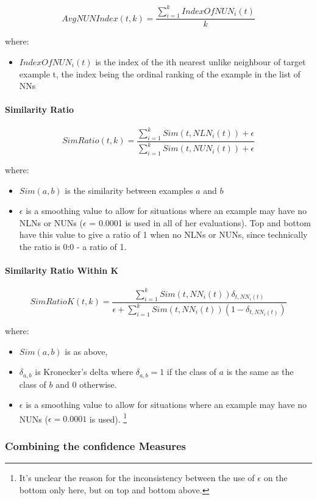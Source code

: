 \documentclass[a4paper,11pt]{report}
\begin{document}
\[
AvgNUNIndex(t,k)=\frac{\sum_{i=1}^{k}IndexOfNUN_{i}(t)}{k}
\]

where:
\begin{itemize}
	\item $IndexOfNUN_{i}(t)$ is the index of the ith nearest unlike neighbour of target example t, the index being the ordinal ranking of the example in the list of NNs
\end{itemize}

\paragraph{Similarity Ratio}
\[
SimRatio(t,k)=\frac{\sum_{i=1}^{k}Sim(t,NLN_{i}(t))+\epsilon}{\sum_{i=1}^{k}Sim(t,NUN_{i}(t))+\epsilon}
\]

where:
\begin{itemize}
	\item $Sim(a, b)$ is the similarity between examples $a$ and $b$ 
	\item $\epsilon$ is a smoothing value to allow for situations where an example may have no NLNs or NUNs ($\epsilon$ = 0.0001 is used in all of her evaluations). Top and bottom have this value to give a ratio of 1 when no NLNs or NUNs, since technically the ratio is 0:0 - a ratio of 1.
\end{itemize}

\paragraph{Similarity Ratio Within K}
\[
SimRatioK(t,k)=\frac{\sum_{i=1}^{k}Sim(t,NN_{i}(t))\delta_{t,NN_{i}(t)}}{\epsilon+\sum_{i=1}^{k}Sim(t,NN_{i}(t))(1-\delta_{t,NN_{i}(t)})}
\]

where:
\begin{itemize}
	\item $Sim(a, b)$ is as above, 
	\item $\delta_{a, b}$ is Kronecker's delta where $\delta_{a, b}=1$ if the class of $a$ is the same as the class of $b$ and $0$ otherwise. 
	\item $\epsilon$ is a smoothing value to allow for situations where an example may have no NUNs ($\epsilon = 0.0001$ is used). \footnote{It's unclear the reason for the inconsistency between the use of $\epsilon$ on the bottom only here, but on top and bottom above.}
\end{itemize}


\subsubsection{Combining the confidence Measures}
\end{document}
